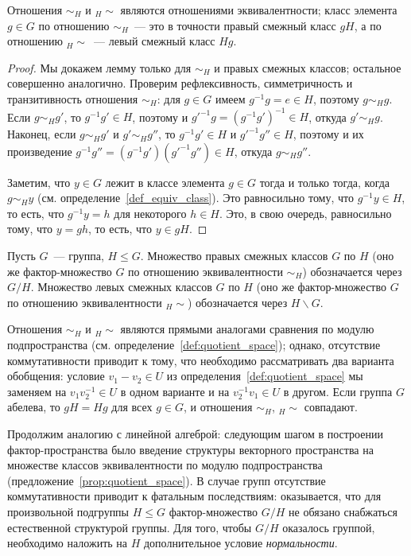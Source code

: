 \begin{lemma}
Отношения $\sim_H$ и ${}_H{\sim}$ являются отношениями эквивалентности;
класс элемента $g\in G$ по отношению $\sim_H$~--- это в точности
правый смежный класс $gH$, а по отношению ${}_H{\sim}$~--- левый смежный
класс $Hg$.
\end{lemma}
\begin{proof}
Мы докажем лемму только для $\sim_H$ и правых смежных классов;
остальное совершенно аналогично.
Проверим рефлексивность, симметричность и транзитивность отношения
$\sim_H$: для $g\in G$ имеем $g^{-1}g=e\in H$, поэтому $g\sim_Hg$.
Если $g\sim_H g'$, то $g^{-1}g'\in H$, поэтому и $g'^{-1}g =
(g^{-1}g')^{-1}\in H$, откуда $g'\sim_H g$. Наконец, если $g\sim_H g'$
и $g'\sim_H g''$, то $g^{-1}g'\in H$ и $g'^{-1}g''\in H$, поэтому и их
произведение $g^{-1}g''=(g^{-1}g')(g'^{-1}g'')\in H$, откуда
$g\sim_Hg''$.

Заметим, что $y\in G$ лежит в классе элемента $g\in G$
тогда и только тогда, когда $g\sim_H y$
(см. определение~\ref{def_equiv_class}). Это равносильно тому, что
$g^{-1}y\in H$, то есть, что $g^{-1}y = h$ для некоторого $h\in
H$. Это, в свою очередь, равносильно тому, что $y=gh$, то есть, что
$y\in gH$.
\end{proof}

\begin{definition}
Пусть $G$~--- группа, $H\leq G$.
Множество правых смежных классов $G$ по $H$ (оно же фактор-множество
$G$ по отношению эквивалентности $\sim_H$) обозначается через
$G/H$. Множество левых смежных классов $G$ по $H$ (оно же
фактор-множество $G$ по отношению эквивалентности ${}_H{\sim}$)
обозначается через $H\backslash G$.
\end{definition}

\begin{remark}\label{rem:coset_analogy}
Отношения $\sim_H$ и ${}_H{\sim}$ являются прямыми аналогами сравнения
по модулю подпространства (см. определение~\ref{def:quotient_space});
однако, отсутствие коммутативности приводит к тому, что необходимо
рассматривать два варианта обобщения: условие $v_1-v_2\in U$ из
определения~\ref{def:quotient_space} мы заменяем на $v_1v_2^{-1}\in U$ в
одном варианте и на $v_2^{-1}v_1\in U$ в другом. Если группа $G$ абелева, то
$gH = Hg$ для всех $g\in G$, и отношения $\sim_H$, ${}_H{\sim}$
совпадают.
\end{remark}

Продолжим аналогию с линейной алгеброй: следующим шагом в построении
фактор-пространства было введение структуры векторного пространства на
множестве классов эквивалентности по модулю подпространства
(предложение~\ref{prop:quotient_space}).
В случае групп отсутствие коммутативности приводит к фатальным
последствиям: оказывается, что для произвольной подгруппы $H\leq G$
фактор-множество $G/H$ не обязано снабжаться естественной структурой
группы. Для того, чтобы $G/H$ оказалось группой, необходимо наложить
на $H$ дополнительное условие {\it нормальности}.

